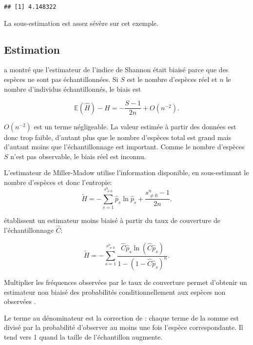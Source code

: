 \documentclass[
  11pt,
  french,
  a4paper,
  extrafontsizes,onecolumn,openright
  ]{memoir}
\begin{document}
\begin{verbatim}
## [1] 4.148322
\end{verbatim}

\normalsize

La sous-estimation est assez sévère sur cet exemple.

\subsection{Estimation}\label{sec-BiaisShannon}

\textcite{Basharin1959} a montré que l'estimateur de l'indice de Shannon était biaisé parce que des espèces ne sont pas échantillonnées.
Si \(S\) est le nombre d'espèces réel et \(n\) le nombre d'individus échantillonnés, le biais est

\begin{equation}
  \label{eq:Basharin1959}
  \mathbb{E}\left(\hat{H}\right)-H =-\frac{S-1}{2n} + O\left(n^{-2}\right).
\end{equation}

\(O\left(n^{-2}\right)\) est un terme négligeable.
La valeur estimée à partir des données est donc trop faible, d'autant plus que le nombre d'espèces total est grand mais d'autant moins que l'échantillonnage est important.
Comme le nombre d'espèces \(S\) n'est pas observable, le biais réel est inconnu.

L'estimateur de Miller-Madow \autocite{Miller1955} utilise l'information disponible, en sous-estimant le nombre d'espèces et donc l'entropie:
\begin{equation}
  \label{eq:MillerMadow}
  \tilde{H} = -\sum^{s^{n}_{\ne 0}}_{s=1}{\hat{p}_s \ln{\hat{p}_s}} + \frac{s^{n}_{\ne 0}-1}{2n}.
\end{equation}

\textcite{Chao2003} établissent un estimateur moins biaisé à partir du taux de couverture de l'échantillonnage \(\hat{C}\):

\begin{equation}
  \label{eq:ChaoShen}
  \tilde{H} = -\sum_{s=1}^{s^{n}_{\ne 0}}{\frac{\hat{C}{\hat{p}}_s \ln\left(\hat{C}{\hat{p}}_s\right)}{1-\left(1-\hat{C}{\hat{p}}_s\right)^n}}.
\end{equation}

Multiplier les fréquences observées par le taux de couverture permet d'obtenir un estimateur non biaisé des probabilités conditionnellement aux espèces non observées \autocite{Ashbridge2000}.

Le terme au dénominateur est la correction de \textcite{Horvitz1952}: chaque terme de la somme est divisé par la probabilité d'observer au moins une fois l'espèce correspondante.
Il tend vers 1 quand la taille de l'échantillon augmente.
\end{document}
